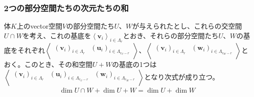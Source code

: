 \documentclass[dvipdfmx]{jsarticle}
\begin{document}
\subsubsection{2つの部分空間たちの次元たちの和}%
\begin{thm}\label{2.1.9.5}
体$K$上のvector空間$V$の部分空間たち$U$、$W$が与えられたとし、これらの交空間$U \cap W$を考え、これの基底を$\left\langle \mathbf{v}_{i} \right\rangle_{i \in \varLambda_{r}}$とおき、それらの部分空間たち$U$、$W$の基底をそれぞれ$\left\langle \begin{matrix}
\left( \mathbf{v}_{i} \right)_{i \in \varLambda_{r}} & \left( \mathbf{u}_{i} \right)_{i \in \varLambda_{r_{U} - r}} \\
\end{matrix} \right\rangle$、$\left\langle \begin{matrix}
\left( \mathbf{v}_{i} \right)_{i \in \varLambda_{r}} & \left( \mathbf{w}_{i} \right)_{i \in \varLambda_{r_{W} - r}} \\
\end{matrix} \right\rangle$とおく。このとき、その和空間$U + W$の基底の1つは$\left\langle \begin{matrix}
\left( \mathbf{v}_{i} \right)_{i \in \varLambda_{r}} & \left( \mathbf{u}_{i} \right)_{i \in \varLambda_{r_{U} - r}} & \left( \mathbf{w}_{i} \right)_{i \in \varLambda_{r_{W} - r}} \\
\end{matrix} \right\rangle$となり次式が成り立つ。
\begin{align*}
\dim{U \cap W} + \dim{U + W} = \dim U + \dim W
\end{align*}
\end{thm}
\end{document}
